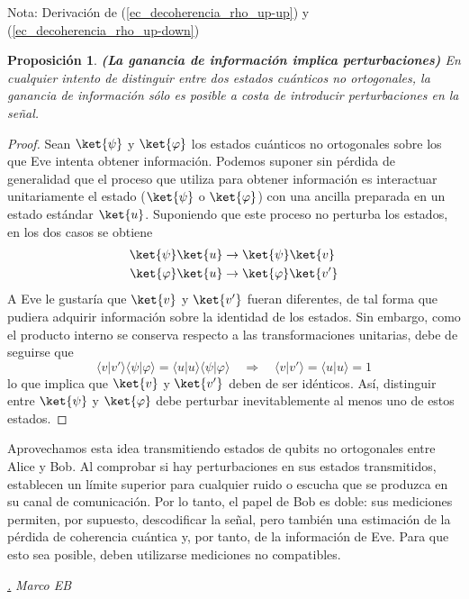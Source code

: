 \documentclass[a4paper,11pt]{book} %
\newtheorem{proposicion_contador}{Proposición}
\newcommand{\Proposicion}[1]{
		\begin{mybox_gray2}{}
			\begin{proposicion_contador}
				 #1 
			\end{proposicion_contador} 
		\end{mybox_gray2}
	}
\numberwithin{equation}{chapter}
\newcommand{\braket}[2]{\langle #1|#2\rangle}
\def\rqa{\quad \Rightarrow \quad}
\def\subsubiContadorIt{\par\addtocounter{subsubsection}{1}\underline{\it\thesubsubsection.}\hskip0.5cm \setcounter{subsubsubsectionIt}{0}}
\newcommand{\SubsubiIt}[1]{
		\subsubiContadorIt \textit{#1}
	}
\newcounter{subsubsubsectionIt}[subsubsection]
\begin{document}
\begin{mybox_blue}{Nota: Derivación de (\ref{ec_decoherencia_rho_up-up}) y  (\ref{ec_decoherencia_rho_up-down})}
	\Proposicion{\textbf{(La ganancia de información implica perturbaciones)} En cualquier intento de distinguir entre dos estados cuánticos no ortogonales, la ganancia de información sólo es posible a costa de introducir perturbaciones en la señal.}

	\begin{proof}
	Sean $\ket{\psi}$ y $\ket{\varphi}$ los estados cuánticos no ortogonales sobre los que Eve intenta obtener información. Podemos suponer sin pérdida de generalidad que el proceso que utiliza para obtener información es interactuar unitariamente el estado ($\ket{\psi}$ o $\ket{\varphi}$) con una ancilla preparada en un estado estándar $\ket{u}$. Suponiendo que este proceso no perturba los estados, en los dos casos se obtiene
	\begin{align}
	\ket{\psi} \ket{u} & \rightarrow \ket{\psi} \ket{v} \\
	\ket{\varphi} \ket{u} & \rightarrow \ket{\varphi} \ket{v'}
	\end{align}
	A Eve le gustaría que $\ket{v}$ y $\ket{v'}$ fueran diferentes, de tal forma que pudiera adquirir información sobre la identidad de los estados. Sin embargo, como el producto interno se conserva respecto a las transformaciones unitarias, debe de seguirse que
	\begin{equation}
	\braket{v}{v'} \braket{\psi}{\varphi} = \braket{u}{u} \braket{\psi}{\varphi} \rqa \braket{v}{v'} = \braket{u}{u} = 1	
	\end{equation}
	lo que implica que $\ket{v}$ y $\ket{v'}$ deben de ser idénticos. Así, distinguir entre $\ket{\psi}$ y $\ket{\varphi}$ debe perturbar inevitablemente al menos uno de estos estados.
	\end{proof}
Aprovechamos esta idea transmitiendo estados de qubits no ortogonales entre Alice y Bob. Al comprobar si hay perturbaciones en sus estados transmitidos, establecen un límite superior para cualquier ruido o escucha que se produzca en su canal de comunicación. Por lo tanto, el papel de Bob es doble: sus mediciones permiten, por supuesto, descodificar la señal, pero también una estimación de la pérdida de coherencia cuántica y, por tanto, de la información de Eve. Para que esto sea posible, deben utilizarse mediciones no compatibles.

			\SubsubiIt{Marco EB}


\end{mybox_blue}
\end{document}
